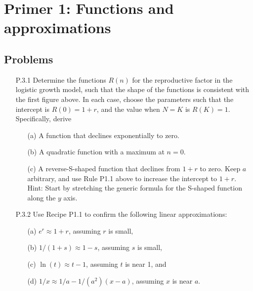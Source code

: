 \chapter{Primer 1: Functions and approximations}

\section{Problems}

\begin{enumerate}
	\item[P.3.1] Determine the functions $R(n)$ for the reproductive factor in the logistic growth model, such that the shape of the functions is consistent with the first figure above. In each case, choose the parameters such that the intercept is $R(0)=1+r$, and the value when $N=K$ is $R(K)=1$. Specifically, derive
	\begin{enumerate}
		\item[(a)] A function that declines exponentially to zero.
		\item[(b)] A quadratic function with a maximum at $n=0$.
		\item[(c)] A reverse-S-shaped function that declines from $1+r$ to zero. Keep $a$ arbitrary, and use Rule P1.1 above to increase the intercept to $1+r$. Hint: Start by stretching the generic formula for the S-shaped function along the $y$ axis.
	\end{enumerate}
	
	\item[P.3.2] Use Recipe P1.1 to confirm the following linear approximations:
	\begin{enumerate}
		\item[(a)] $e^r \approx 1 + r$, assuming $r$ is small,
		\item[(b)] $1/(1+s) \approx 1 - s$, assuming $s$ is small,
		\item[(c)] $\ln(t) \approx t - 1$, assuming $t$ is near 1, and
		\item[(d)] $1/x \approx 1/a - 1/(a^2) (x - a)$, assuming $x$ is near $a$.
	\end{enumerate}
\end{enumerate}